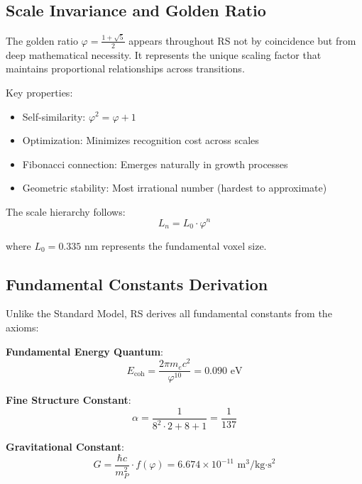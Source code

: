 \documentclass[12pt,a4paper]{article}
\newcommand{\Ecoh}{E_{\text{coh}}}
\newcommand{\golden}{\varphi}
\theoremstyle{definition}
\begin{document}
\subsection{Scale Invariance and Golden Ratio}

The golden ratio $\golden = \frac{1+\sqrt{5}}{2}$ appears throughout RS not by coincidence but from deep mathematical necessity. It represents the unique scaling factor that maintains proportional relationships across transitions.

Key properties:
\begin{itemize}
    \item Self-similarity: $\golden^2 = \golden + 1$
    \item Optimization: Minimizes recognition cost across scales
    \item Fibonacci connection: Emerges naturally in growth processes
    \item Geometric stability: Most irrational number (hardest to approximate)
\end{itemize}

The scale hierarchy follows:
\begin{equation}
    L_n = L_0 \cdot \golden^n
\end{equation}

where $L_0 = 0.335$ nm represents the fundamental voxel size.

\subsection{Fundamental Constants Derivation}

Unlike the Standard Model, RS derives all fundamental constants from the axioms:

\begin{resultbox}
\textbf{Fundamental Energy Quantum}:
\begin{equation}
    \Ecoh = \frac{2\pi m_e c^2}{\golden^{10}} = 0.090 \text{ eV}
\end{equation}

\textbf{Fine Structure Constant}:
\begin{equation}
    \alpha = \frac{1}{8^2 \cdot 2 + 8 + 1} = \frac{1}{137}
\end{equation}

\textbf{Gravitational Constant}:
\begin{equation}
    G = \frac{\hbar c}{m_P^2} \cdot f(\golden) = 6.674 \times 10^{-11} \text{ m}^3/\text{kg·s}^2
\end{equation}
\end{resultbox}
\end{document}
